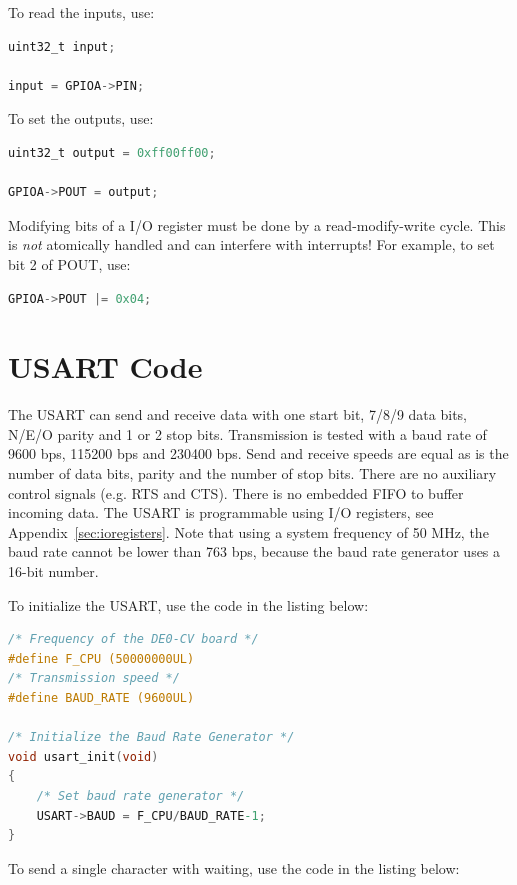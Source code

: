 \documentclass[12pt]{article}
\begin{document}
To read the inputs, use:

\begin{lstlisting}[language=C]
uint32_t input;

input = GPIOA->PIN;
\end{lstlisting}

To set the outputs, use:

\begin{lstlisting}[language=C]
uint32_t output = 0xff00ff00;

GPIOA->POUT = output;
\end{lstlisting}

Modifying bits of a I/O register must be done by a read-modify-write cycle. This is \emph{not} atomically handled and can interfere with interrupts! For example, to set bit 2 of POUT, use:

\begin{lstlisting}[language=C]
GPIOA->POUT |= 0x04;
\end{lstlisting}

\section{USART Code}

The USART can send and receive data with one start bit, 7/8/9 data bits, N/E/O parity and 1 or 2 stop bits. Transmission is tested with a baud rate of 9600 bps, 115200 bps and 230400 bps. Send and receive speeds are equal as is the number of data bits, parity and the number of stop bits. There are no auxiliary control signals (e.g. RTS and CTS). There is no embedded FIFO to buffer incoming data. The USART is programmable using I/O registers, see Appendix~\ref{sec:ioregisters}. Note that using a system frequency of 50 MHz, the baud rate cannot be lower than 763 bps, because the baud rate generator uses a 16-bit number.

To initialize the USART, use the code in the listing below:

\begin{lstlisting}[language=C]
/* Frequency of the DE0-CV board */
#define F_CPU (50000000UL)
/* Transmission speed */
#define BAUD_RATE (9600UL)

/* Initialize the Baud Rate Generator */
void usart_init(void)
{
    /* Set baud rate generator */
    USART->BAUD = F_CPU/BAUD_RATE-1;
}
\end{lstlisting}

To send a single character with waiting, use the code in the listing below:
\end{document}
